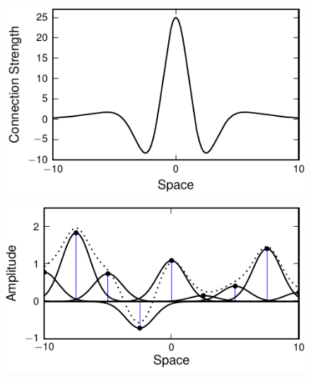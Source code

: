 \documentclass[review,authoryear,3p]{elsarticle}
\begin{document}
\clearpage
\newpage
\begin{figure}[!ht]
\begin{center}
\includegraphics{./Graph/pdf/fig1.pdf}
\end{center}
\caption{}
\label{fig:Figure1}
\end{figure}
\clearpage
\newpage
\begin{figure}[!ht]
\begin{center}
\includegraphics{./Graph/pdf/fig2.pdf}
\end{center}
\caption{}
\label{fig:Figure2}
\end{figure}
\clearpage
\newpage
\end{document}
